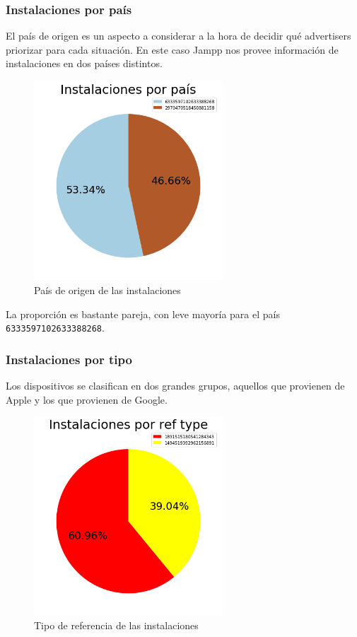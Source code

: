 \documentclass[a4paper, 12pt]{article}
\begin{document}
	\subsubsection{Instalaciones por país}
		El país de origen es un aspecto a considerar a la hora de decidir qué advertisers priorizar para cada situación. En este caso Jampp nos provee información de instalaciones en dos países distintos.
		
		\FloatBarrier
		\begin{figure}[h]
			\centering
			\includegraphics[width=200pt]{images/installs/piechartpaises.png}
			\caption{País de origen de las instalaciones}
		\end{figure}
		\FloatBarrier
		
		La proporción es bastante pareja, con leve mayoría para el país \texttt{6333597102633388268}.
		
	\subsubsection{Instalaciones por tipo}
		Los dispositivos se clasifican en dos grandes grupos, aquellos que provienen de Apple y los que provienen de Google.
		
		\FloatBarrier
		\begin{figure}[h]
			\centering
			\includegraphics[width= 200pt]{images/installs/ref_type.png}
			\caption{Tipo de referencia de las instalaciones}
		\end{figure}
		\FloatBarrier
		
\end{document}
